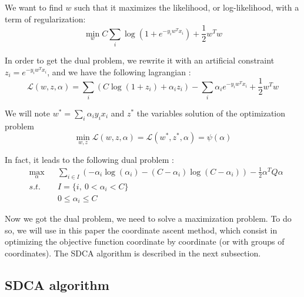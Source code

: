 \documentclass{article}
\begin{document}
We want to find $w$ such that it maximizes the likelihood, or log-likelihood, with a term of regularization:
\begin{equation}
	\min_w C \sum_i \log\left(1 + e^{-y_iw^Tx_i}\right)  + \frac{1}{2} w^Tw
\end{equation}

In order to get the dual problem, we rewrite it with an artificial constraint $z_i = e^{-y_iw^Tx_i}$, and we have the following lagrangian :
\begin{equation}
	\mathcal{L}(w, z, \alpha) = \sum_i (C \log\left(1+z_i\right) + \alpha_i z_i) - \sum_i \alpha_i e^{-y_iw^Tx_i} + \frac{1}{2}w^Tw 
\end{equation}

We will note $w^* = \sum_i \alpha_i y_i x_i$ and $z^*$ the variables solution of the optimization problem
\begin{equation}
	\min_{w, z} \mathcal{L}(w, z, \alpha) = \mathcal{L}(w^*, z^*, \alpha) = \psi(\alpha) 
\end{equation}

In fact, it leads to the following dual problem :
\begin{equation}
	\begin{aligned}
		& \max_{\alpha} & &\sum_{i \in I} (-\alpha_i \log(\alpha_i) - (C-\alpha_i) \log(C - \alpha_i)) - \frac{1}{2} \alpha^TQ\alpha\\
		& s.t.          & &I = \{i,\ 0 < \alpha_i < C \}\\
		&               & &0 \leq \alpha_i \leq C
	\end{aligned}
\end{equation}

Now we got the dual problem, we need to solve a maximization problem.
To do so, we will use in this paper the coordinate ascent method, which consist in optimizing the objective function coordinate by coordinate (or with groups of coordinates).
The SDCA algorithm is described in the next subsection.

\subsection{SDCA algorithm}
\end{document}
